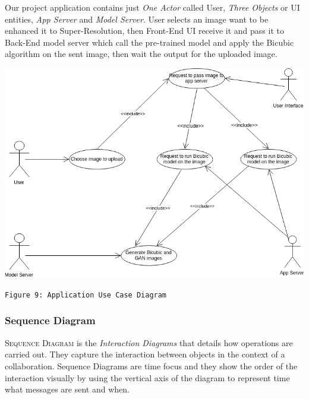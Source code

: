 \documentclass[12pt]{article}
\begin{document}
				Our project application contains just \textit{One Actor} called User, \textit{Three Objects} or UI entities, \textit{App Server} and \textit{Model Server}. User selects an image want to be enhanced it to Super-Resolution, then Front-End UI receive it and pass it to Back-End model server which call the pre-trained model and apply the Bicubic algorithm on the sent image, then wait the output for the uploaded image.
				\begin{center}
					\vspace{0.1in}
					\includegraphics[width=6in]{Images/UseCaseDiagram.png}
				
					\texttt{Figure 9: Application Use Case Diagram}
					\vspace{0.1in}
				\end{center}
			
			\subsubsection{Sequence Diagram}
				\textsc{Sequence Diagram} is the \textit{Interaction Diagrams} that details how operations are carried out. They capture the interaction between objects in the context of a collaboration. Sequence Diagrams are time focus and they show the order of the interaction visually by using the vertical axis of the diagram to represent time what messages are sent and when.
				
\end{document}
